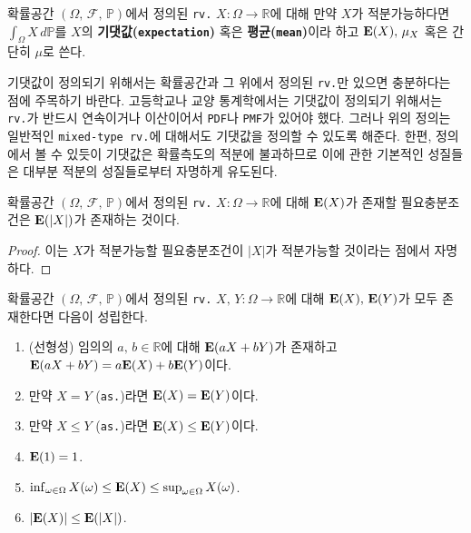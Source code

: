 \begin{definition}
    확률공간 $(\Omega,\,\mathcal{F},\,\mathbb{P})$에서 정의된 \texttt{rv.} $X:\Omega\to\mathbb{R}$에 대해 만약 $X$가 적분가능하다면 $\int_\Omega X\,d\mathbb{P}$를 $X$의 \textbf{기댓값(\texttt{expectation})} 혹은 \textbf{평균(\texttt{mean})}이라 하고 $\mathbf{E}(X),\,\mu_X$ 혹은 간단히 $\mu$로 쓴다.
\end{definition}

기댓값이 정의되기 위해서는 확률공간과 그 위에서 정의된 \texttt{rv.}만 있으면 충분하다는 점에 주목하기 바란다. 고등학교나 교양 통계학에서는 기댓값이 정의되기 위해서는 \texttt{rv.}가 반드시 연속이거나 이산이어서 \texttt{PDF}나 \texttt{PMF}가 있어야 했다. 그러나 위의 정의는 일반적인 \texttt{mixed-type rv.}에 대해서도 기댓값을 정의할 수 있도록 해준다.  한편, 정의에서 볼 수 있듯이 기댓값은 확률측도의 적분에 불과하므로 이에 관한 기본적인 성질들은 대부분 적분의 성질들로부터 자명하게 유도된다.

\begin{proposition}
    확률공간 $(\Omega,\,\mathcal{F},\,\mathbb{P})$에서 정의된 \texttt{rv.} $X:\Omega\to\mathbb{R}$에 대해 $\mathbf{E}(X)$가 존재할 필요충분조건은 $\mathbf{E}(|X|)$가 존재하는 것이다.
\end{proposition}

\begin{proof}
    이는 $X$가 적분가능할 필요충분조건이 $|X|$가 적분가능할 것이라는 점에서 자명하다.
\end{proof}

\begin{theorem}
    확률공간 $(\Omega,\,\mathcal{F},\,\mathbb{P})$에서 정의된 \texttt{rv.} $X,\,Y:\Omega\to\mathbb{R}$에 대해 $\mathbf{E}(X),\,\mathbf{E}(Y)$가 모두 존재한다면 다음이 성립한다.
    \begin{enumerate}
        \item (선형성) 임의의 $a,\,b\in\mathbb{R}$에 대해 $\mathbf{E}(aX+bY)$가 존재하고 $\mathbf{E}(aX+bY)=a\mathbf{E}(X)+b\mathbf{E}(Y)$이다.
        \item 만약 $X=Y$ (\texttt{as.})라면 $\mathbf{E}(X)=\mathbf{E}(Y)$이다.
        \item 만약 $X\leq Y$ (\texttt{as.})라면 $\mathbf{E}(X)\leq\mathbf{E}(Y)$이다.
        \item $\mathbf{E}(1)=1$.
        \item $\inf_{\omega\in\Omega}X(\omega)\leq\mathbf{E}(X)\leq\sup_{\omega\in\Omega}X(\omega)$.
        \item $|\mathbf{E}(X)|\leq\mathbf{E}(|X|)$.
    \end{enumerate}
\end{theorem}

